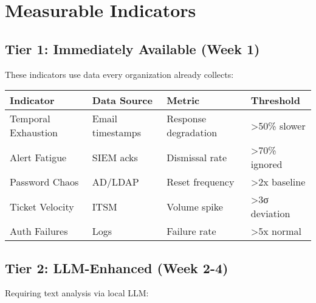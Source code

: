 \documentclass[11pt,a4paper]{article}
\begin{document}
\section{Measurable Indicators}

\subsection{Tier 1: Immediately Available (Week 1)}

These indicators use data every organization already collects:

\begin{table}[h]
\centering
\begin{tabular}{|l|l|l|l|}
\hline
\textbf{Indicator} & \textbf{Data Source} & \textbf{Metric} & \textbf{Threshold} \\
\hline
Temporal Exhaustion & Email timestamps & Response degradation & >50\% slower \\
Alert Fatigue & SIEM acks & Dismissal rate & >70\% ignored \\
Password Chaos & AD/LDAP & Reset frequency & >2x baseline \\
Ticket Velocity & ITSM & Volume spike & >3σ deviation \\
Auth Failures & Logs & Failure rate & >5x normal \\
\hline
\end{tabular}
\end{table}

\subsection{Tier 2: LLM-Enhanced (Week 2-4)}

Requiring text analysis via local LLM:
\end{document}

